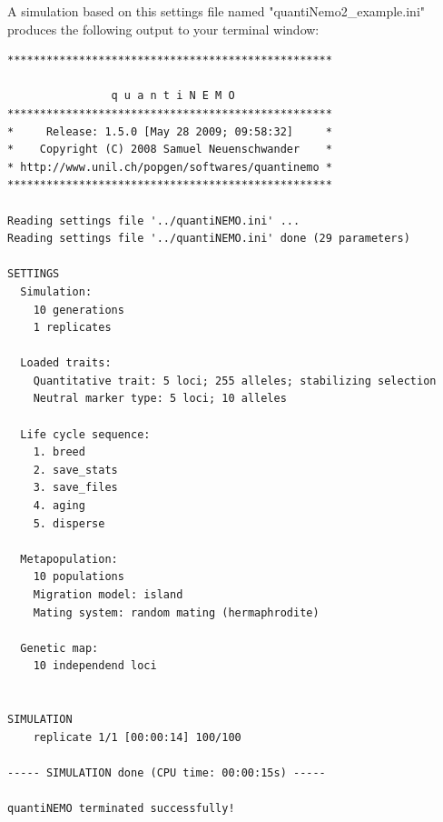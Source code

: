\documentclass[letterpaper,12pt,oneside]{book}
\begin{document}
A simulation based on this settings file named "quantiNemo2\_example.ini" produces the following output to your terminal window:
\begin{lstlisting}[frame=single]
**************************************************

                q u a n t i N E M O
**************************************************
*     Release: 1.5.0 [May 28 2009; 09:58:32]     *
*    Copyright (C) 2008 Samuel Neuenschwander    *
* http://www.unil.ch/popgen/softwares/quantinemo *
**************************************************

Reading settings file '../quantiNEMO.ini' ...
Reading settings file '../quantiNEMO.ini' done (29 parameters)

SETTINGS
  Simulation:
    10 generations
    1 replicates

  Loaded traits:
    Quantitative trait: 5 loci; 255 alleles; stabilizing selection
    Neutral marker type: 5 loci; 10 alleles

  Life cycle sequence:
    1. breed
    2. save_stats
    3. save_files
    4. aging
    5. disperse

  Metapopulation:
    10 populations
    Migration model: island
    Mating system: random mating (hermaphrodite)

  Genetic map:
    10 independend loci


SIMULATION
    replicate 1/1 [00:00:14] 100/100

----- SIMULATION done (CPU time: 00:00:15s) -----

quantiNEMO terminated successfully!
\end{lstlisting}
\end{document}
